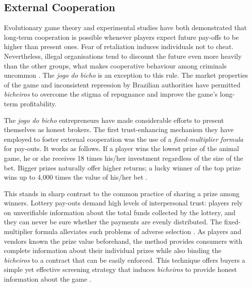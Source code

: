 \documentclass[a4paper,12pt]{article}
\begin{document}
\subsection{External Cooperation}
\label{sub:external}

Evolutionary game theory \citep{axelrod1984evolution, axelrod1985achieving, smith1982evolution} and experimental studies \citep{dawes1977behavior, isaac1984divergent, kim1984free, marwell1981economists} have both demonstrated that long-term cooperation is possible whenever players expect future pay-offs to be higher than present ones. Fear of retaliation induces individuals not to cheat. Nevertheless, illegal organisations tend to discount the future even more heavily than the other groups, what makes cooperative behaviour among criminals uncommon \citep{gambetta2009codes, skarbek2011governance,skarbek2012prison,skarbek2014social}. The \emph{jogo do bicho} is an exception to this rule. The market properties of the game and inconsistent repression by Brazilian authorities have permitted \emph{bicheiros} to overcome the stigma of repugnance and improve the game's long-term profitability.

The \emph{jogo do bicho} entrepreneurs have made considerable efforts to present themselves as honest brokers. The first trust-enhancing mechanism they have employed to foster external cooperation was the use of a \emph{fixed-multiplier formula} for pay-outs. It works as follows. If a player wins the lowest prize of the animal game, he or she receives 18 times his/her investment regardless of the size of the bet. Bigger prizes naturally offer higher returns; a lucky winner of the top prize wins up to 4,000 times the value of his/her bet \citetext{\citealp[89]{labronici2012paratodos}; \citealp[20]{magalhaes2005ganhou}}.

This stands in sharp contrast to the common practice of sharing a prize among winners. Lottery pay-outs demand high levels of interpersonal trust: players rely on unverifiable information about the total funds collected by the lottery, and they can never be sure whether the payments are evenly distributed. The fixed-multiplier formula alleviates such problems of adverse selection \citep{akerlof1970market, cohen2010testing, levin2001information}. As players and vendors known the prize value beforehand, the method provides consumers with complete information about their individual prizes while also binding the \emph{bicheiros} to a contract that can be easily enforced. This technique offers buyers a simple yet effective screening strategy that induces \emph{bicheiros} to provide honest information about the game \citep{spence1973job, stiglitz1981credit}.
\end{document}
